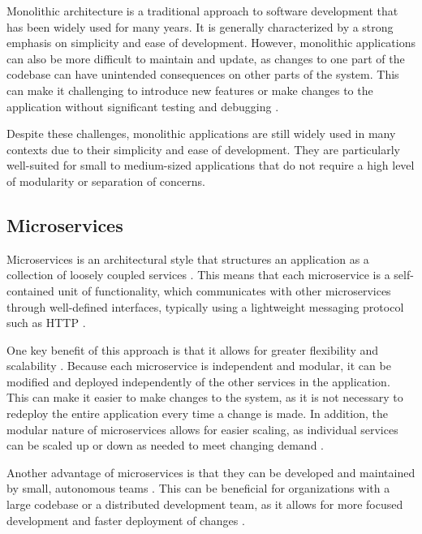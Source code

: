 \documentclass[conference]{IEEEtran}
\begin{document}
Monolithic architecture is a traditional approach to software development that
has been widely used for many years. It is generally characterized by a strong
emphasis on simplicity and ease of development. However, monolithic
applications can also be more difficult to maintain and update, as changes to
one part of the codebase can have unintended consequences on other parts of the
system. This can make it challenging to introduce new features or make changes
to the application without significant testing and debugging
\cite{kazanavivcius2019migrating}.

Despite these challenges, monolithic applications are still widely used in many
contexts due to their simplicity and ease of development. They are particularly
well-suited for small to medium-sized applications that do not require a high
level of modularity or separation of concerns.

\subsection{Microservices}

Microservices is an architectural style that structures an application as a
collection of loosely coupled services \cite{newman2021building}. This means
that each microservice is a self-contained unit of functionality, which
communicates with other microservices through well-defined interfaces,
typically using a lightweight messaging protocol such as HTTP
\cite{fowler-microservices}.

One key benefit of this approach is that it allows for greater flexibility and
scalability \cite{newman2019monolith}. Because each microservice is independent
and modular, it can be modified and deployed independently of the other
services in the application. This can make it easier to make changes to the
system, as it is not necessary to redeploy the entire application every time a
change is made. In addition, the modular nature of microservices allows for
easier scaling, as individual services can be scaled up or down as needed to
meet changing demand
\cite{newman2019monolith,newman2021building,fowler-microservices}.

Another advantage of microservices is that they can be developed and maintained
by small, autonomous teams \cite{chen2018microservices}. This can be beneficial
for organizations with a large codebase or a distributed development team, as
it allows for more focused development and faster deployment of changes
\cite{nadareishvili2016microservice}.
\end{document}

